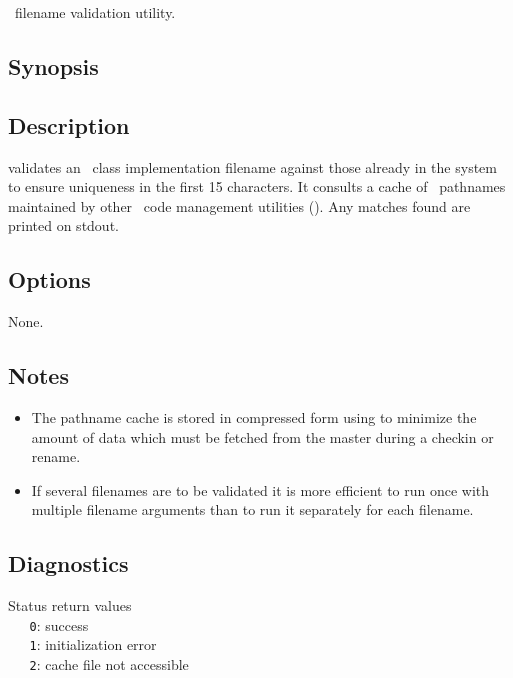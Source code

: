 \aipspp\ filename validation utility.

\subsection*{Synopsis}

\begin{synopsis}
\end{synopsis}

\subsection*{Description}

 validates an \aipspp\ class implementation filename against those
already in the system to ensure uniqueness in the first 15 characters.  It
consults a cache of \aipspp\ pathnames maintained by other \aipspp\ 
code management utilities ().  Any
matches found are printed on stdout.

\subsection*{Options}

None.

\subsection*{Notes}

\begin{itemize}
\item
   The pathname cache is stored in compressed form using  to
   minimize the amount of data which must be fetched from the master during a
   checkin or rename.

\item
   If several filenames are to be validated it is more efficient to run
   \exe{av} once with multiple filename arguments than to run it separately
   for each filename.
\end{itemize}

\subsection*{Diagnostics}

Status return values
\\ \verb+   0+: success
\\ \verb+   1+: initialization error
\\ \verb+   2+: cache file not accessible

